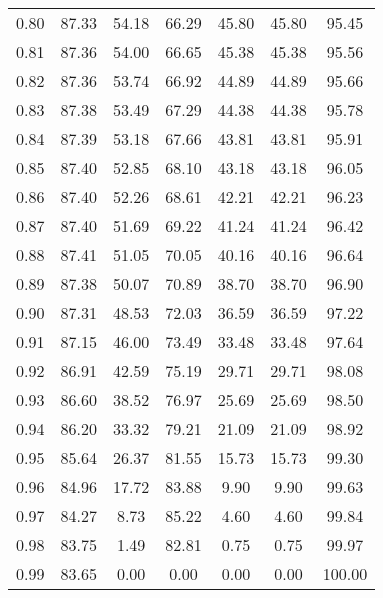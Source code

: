 \begin{tabular}{|c|c|c|c|c|c|c|}
      0.80 &     87.33 &     54.18 &      66.29 &   45.80 &      45.80 &         95.45 \\
      0.81 &     87.36 &     54.00 &      66.65 &   45.38 &      45.38 &         95.56 \\
      0.82 &     87.36 &     53.74 &      66.92 &   44.89 &      44.89 &         95.66 \\
      0.83 &     87.38 &     53.49 &      67.29 &   44.38 &      44.38 &         95.78 \\
      0.84 &     87.39 &     53.18 &      67.66 &   43.81 &      43.81 &         95.91 \\
      0.85 &     87.40 &     52.85 &      68.10 &   43.18 &      43.18 &         96.05 \\
      0.86 &     87.40 &     52.26 &      68.61 &   42.21 &      42.21 &         96.23 \\
      0.87 &     87.40 &     51.69 &      69.22 &   41.24 &      41.24 &         96.42 \\
      0.88 &     87.41 &     51.05 &      70.05 &   40.16 &      40.16 &         96.64 \\
      0.89 &     87.38 &     50.07 &      70.89 &   38.70 &      38.70 &         96.90 \\
      0.90 &     87.31 &     48.53 &      72.03 &   36.59 &      36.59 &         97.22 \\
      0.91 &     87.15 &     46.00 &      73.49 &   33.48 &      33.48 &         97.64 \\
      0.92 &     86.91 &     42.59 &      75.19 &   29.71 &      29.71 &         98.08 \\
      0.93 &     86.60 &     38.52 &      76.97 &   25.69 &      25.69 &         98.50 \\
      0.94 &     86.20 &     33.32 &      79.21 &   21.09 &      21.09 &         98.92 \\
      0.95 &     85.64 &     26.37 &      81.55 &   15.73 &      15.73 &         99.30 \\
      0.96 &     84.96 &     17.72 &      83.88 &    9.90 &       9.90 &         99.63 \\
      0.97 &     84.27 &      8.73 &      85.22 &    4.60 &       4.60 &         99.84 \\
      0.98 &     83.75 &      1.49 &      82.81 &    0.75 &       0.75 &         99.97 \\
      0.99 &     83.65 &      0.00 &       0.00 &    0.00 &       0.00 &        100.00 \\
\bottomrule
\end{tabular}
